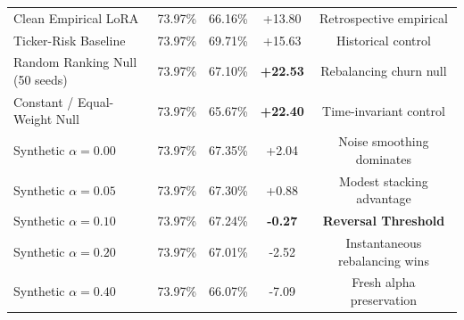 \begin{table}[t]
{\begin{tabular}{lcccc}
\hline
Clean Empirical LoRA & 73.97\% & 66.16\% & +13.80 & Retrospective empirical \\
Ticker-Risk Baseline & 73.97\% & 69.71\% & +15.63 & Historical control \\
Random Ranking Null (50 seeds) & 73.97\% & 67.10\% & \textbf{+22.53} & Rebalancing churn null \\
Constant / Equal-Weight Null & 73.97\% & 65.67\% & \textbf{+22.40} & Time-invariant control \\
Synthetic $\alpha = 0.00$ & 73.97\% & 67.35\% & +2.04 & Noise smoothing dominates \\
Synthetic $\alpha = 0.05$ & 73.97\% & 67.30\% & +0.88 & Modest stacking advantage \\
Synthetic $\alpha = 0.10$ & 73.97\% & 67.24\% & \textbf{-0.27} & \textbf{Reversal Threshold} \\
Synthetic $\alpha = 0.20$ & 73.97\% & 67.01\% & -2.52 & Instantaneous rebalancing wins \\
Synthetic $\alpha = 0.40$ & 73.97\% & 66.07\% & -7.09 & Fresh alpha preservation \\
\hline
\end{tabular}%
}
\end{table}
